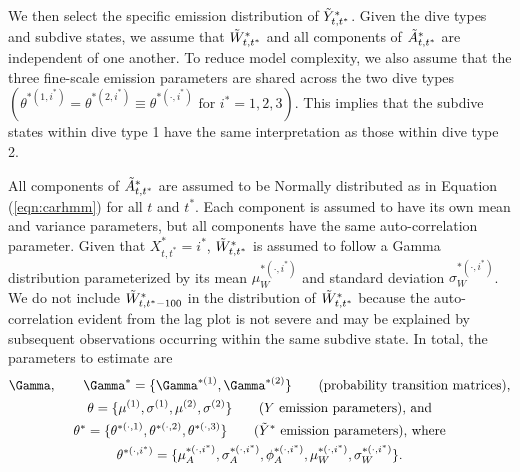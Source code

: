 We then select the specific emission distribution of $\tilde{Y}^*_{t,t^*}$. Given the dive types and subdive states, we assume that $\tilde{W}^*_{t,t^*}$ and all components of $\tilde{A}^*_{t,t^*}$ are independent of one another. To reduce model complexity, we also assume that the three fine-scale emission parameters are shared across the two dive types $\left(\theta^{*(1,i^*)} = \theta^{*(2,i^*)} \equiv \theta^{*(\cdot,i^*)} \text{ for } i^* = 1,2,3\right)$. This implies that the subdive states within dive type 1 have the same interpretation as those within dive type 2.

All components of $\tilde{A}^*_{t,t^*}$ are assumed to be Normally distributed as in Equation (\ref{eqn:carhmm}) for all $t$ and $t^*$. Each component is assumed to have its own mean and variance parameters, but all components have the same auto-correlation parameter. 
Given that $X^*_{t,t^*} = i^*$, $\tilde{W}^*_{t,t^*}$ is assumed to follow a Gamma distribution parameterized by its mean $\mu_W^{*(\cdot,i^*)}$ and standard deviation $\sigma_W^{*(\cdot,i^*)}$. We do not include $\tilde{W}^*_{t,t^*-100}$ in the distribution of $\tilde{W}^*_{t,t^*}$ because the auto-correlation evident from the lag plot is not severe and may be explained by subsequent observations occurring within the same subdive state. 
%
In total, the parameters to estimate are
%
\begin{gather*}
    \Gamma, \qquad \Gamma^{*} = \{\Gamma^{*(1)},\Gamma^{*(2)}\} \qquad \text{(probability transition matrices)}, \\
    \theta = \{\mu^{(1)},\sigma^{(1)},\mu^{(2)},\sigma^{(2)}\} \qquad \text{($Y$ emission parameters), and} \\
    \theta^* = \{\theta^{*(\cdot,1)},\theta^{*(\cdot,2)},\theta^{*(\cdot,3)}\}  \qquad \text{($\Z$ emission parameters), where} \\
    \theta^{*(\cdot,i^*)} =  \{\mu_A^{*(\cdot,i^*)},\sigma_A^{*(\cdot,i^*)},\phi_A^{*(\cdot,i^*)},\mu_W^{*(\cdot,i^*)},\sigma_W^{*(\cdot,i^*)}\}.
\end{gather*}
